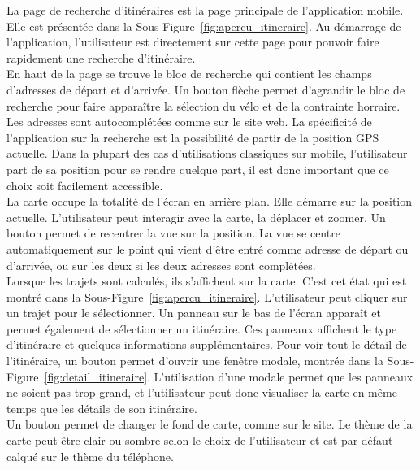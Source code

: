 \noindent La page de recherche d'itinéraires est la page principale de l'application mobile. Elle est présentée dans la Sous-Figure~\ref{fig:apercu_itineraire}. Au démarrage de l'application, l'utilisateur est directement sur cette page pour pouvoir faire rapidement une recherche d'itinéraire.\\

\noindent En haut de la page se trouve le bloc de recherche qui contient les champs d'adresses de départ et d'arrivée. Un bouton flèche permet d'agrandir le bloc de recherche pour faire apparaître la sélection du vélo et de la contrainte horraire. Les adresses sont autocomplétées comme sur le site web. La spécificité de l'application sur la recherche est la possibilité de partir de la position GPS actuelle. Dans la plupart des cas d'utilisations classiques sur mobile, l'utilisateur part de sa position pour se rendre quelque part, il est donc important que ce choix soit facilement accessible.\\

\noindent La carte occupe la totalité de l'écran en arrière plan. Elle démarre sur la position actuelle. L'utilisateur peut interagir avec la carte, la déplacer et zoomer. Un bouton permet de recentrer la vue sur la position. La vue se centre automatiquement sur le point qui vient d'être entré comme adresse de départ ou d'arrivée, ou sur les deux si les deux adresses sont complétées.\\

\noindent Lorsque les trajets sont calculés, ils s'affichent sur la carte. C'est cet état qui est montré dans la Sous-Figure~\ref{fig:apercu_itineraire}. L'utilisateur peut cliquer sur un trajet pour le sélectionner. Un panneau sur le bas de l'écran apparaît et permet également de sélectionner un itinéraire. Ces panneaux affichent le type d'itinéraire et quelques informations supplémentaires. Pour voir tout le détail de l'itinéraire, un bouton permet d'ouvrir une fenêtre modale, montrée dans la Sous-Figure~\ref{fig:detail_itineraire}. L'utilisation d'une modale permet que les panneaux ne soient pas trop grand, et l'utilisateur peut donc visualiser la carte en même temps que les détails de son itinéraire.\\

\noindent Un bouton permet de changer le fond de carte, comme sur le site. Le thème de la carte peut être clair ou sombre selon le choix de l'utilisateur et est par défaut calqué sur le thème du téléphone.\\


